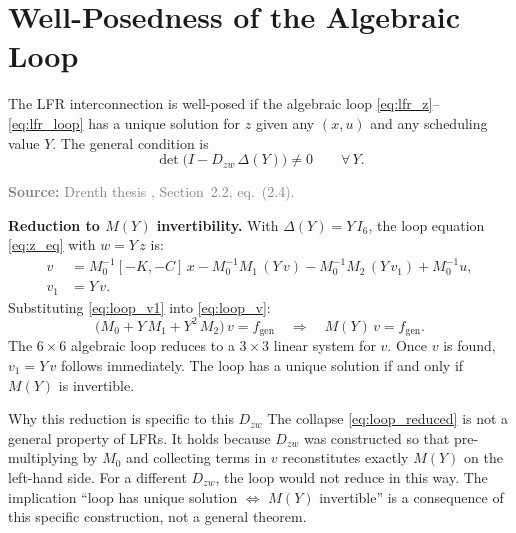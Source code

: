 \documentclass[11pt]{article}
\newcommand{\sourcenote}[1]{%
    \par\vspace{0.4em}%
    \textcolor{gray}{\footnotesize\textbf{Source:} #1}%
}
\begin{document}
\section{Well-Posedness of the Algebraic Loop}
\label{sec:wp}

The LFR interconnection is well-posed if the algebraic loop
\eqref{eq:lfr_z}--\eqref{eq:lfr_loop} has a unique solution for $z$ given any
$(x, u)$ and any scheduling value $Y$.
The general condition is
\begin{equation}
    \det\bigl(I - D_{zw}\,\Delta(Y)\bigr) \neq 0 \qquad \forall\,Y.
    \label{eq:wp_general}
\end{equation}

\sourcenote{Drenth thesis \cite{drenth2025thesis}, Section~2.2, eq.\ (2.4).}

\medskip
\noindent\textbf{Reduction to $M(Y)$ invertibility.}
With $\Delta(Y) = Y\,I_6$, the loop equation \eqref{eq:z_eq} with $w = Y\,z$ is:
\begin{align}
    v   &= M_0^{-1}[-K,-C]\,x - M_0^{-1}M_1\,(Y\,v) - M_0^{-1}M_2\,(Y\,v_1) + M_0^{-1}u,
    \label{eq:loop_v}\\
    v_1 &= Y\,v. \label{eq:loop_v1}
\end{align}
Substituting \eqref{eq:loop_v1} into \eqref{eq:loop_v}:
\begin{equation}
    \bigl(M_0 + Y\,M_1 + Y^2\,M_2\bigr)\,v = f_\mathrm{gen}
    \quad\Longrightarrow\quad
    M(Y)\,v = f_\mathrm{gen}.
    \label{eq:loop_reduced}
\end{equation}
The $6\times6$ algebraic loop reduces to a $3\times3$ linear system for $v$.
Once $v$ is found, $v_1 = Y\,v$ follows immediately.
The loop has a unique solution if and only if $M(Y)$ is invertible.

\medskip
\begin{notebox}{Why this reduction is specific to this $D_{zw}$}
    The collapse \eqref{eq:loop_reduced} is not a general property of LFRs.
    It holds because $D_{zw}$ was constructed so that pre-multiplying by $M_0$ and collecting
    terms in $v$ reconstitutes exactly $M(Y)$ on the left-hand side.
    For a different $D_{zw}$, the loop would not reduce in this way.
    The implication ``loop has unique solution $\Leftrightarrow$ $M(Y)$ invertible'' is
    a consequence of this specific construction, not a general theorem.
\end{notebox}
\end{document}
